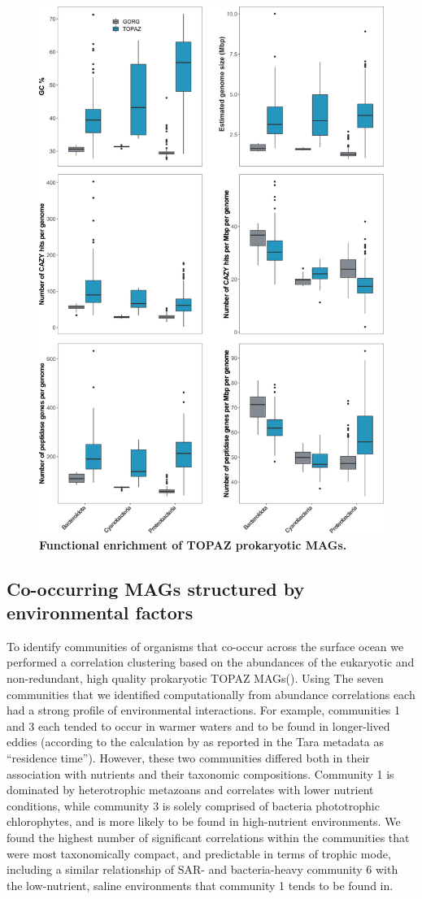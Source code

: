 \documentclass[12pt]{article}
\numberwithin{equation}{section}
\begin{document}
\begin{figure}[h!]    
    \centering
    \includegraphics[width = 0.75\columnwidth]{figures/Figure2-TOPAZ_prok_features_vsGORG_mod.png}
    \caption{\textbf{Functional enrichment of TOPAZ prokaryotic MAGs.} }
    \label{fig:fig4-trophy}
\end{figure}

\subsection*{Co-occurring MAGs structured by environmental factors } %
To identify communities of organisms that co-occur across the surface ocean we performed a correlation clustering based on the abundances of the eukaryotic and non-redundant, high quality prokaryotic TOPAZ MAGs(). Using The seven communities that we identified computationally from abundance correlations each had a strong profile of environmental interactions. For example, communities 1 and 3 each tended to occur in warmer waters and to be found in longer-lived eddies (according to the calculation by \cite{d2010fluid} as reported in the Tara metadata \cite{taraoceansconsortium2014ross} as ``residence time''). However, these two communities differed both in their association with nutrients and their taxonomic compositions. Community 1 is dominated by heterotrophic metazoans and correlates with lower nutrient conditions, while community 3 is solely comprised of bacteria phototrophic chlorophytes, and is more likely to be found in high-nutrient environments. We found the highest number of significant correlations within the communities that were most taxonomically compact, and predictable in terms of trophic mode, including a similar relationship of SAR- and bacteria-heavy community 6 with the low-nutrient, saline environments that community 1 tends to be found in. 
\end{document}
